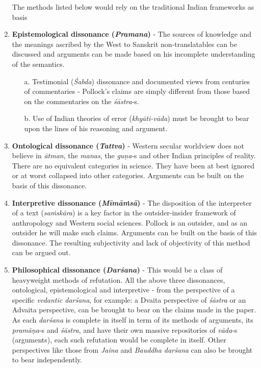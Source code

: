 \begin{enumerate}
The methods listed below would rely on the traditional Indian frameworks as basis

\item {\bf Epistemological dissonance ({{\sl\bfseries Pramana}\relax})} - The sources of knowledge and the meanings ascribed by the West to Sanskrit non-translatables can be discussed and arguments can be made based on his incomplete understanding of the semantics.
\begin{itemize}
\item[a.]  Testimonial ({\sl Śabda}) dissonance and documented views from centuries of commentaries - Pollock's claims are simply different from those based on the commentaries on the {\sl śāstra}-s.

\item[b.] Use of Indian theories of error ({\sl khyāti-vāda}) must be brought to bear upon the lines of his reasoning and argument.
\end{itemize}

\item {\bf Ontological dissonance ({{\sl\bfseries Tattva}\relax})} -  Western secular worldview does not believe in {\sl ātman}, the {\sl manas}, the {\sl guṇa}-s and other Indian principles of reality. There are no equivalent categories in science. They have been at best ignored or at worst collapsed into other categories. Arguments can be built on the basis of this dissonance.

\item {\bf Interpretive dissonance ({{\sl\bfseries Mīmāṁsā}\relax})} - The disposition of the interpreter of a text ({\sl saṁskāra}) is a key factor in the outsider-insider framework of anthropology and Western social sciences. Pollock is an outsider, and as an outsider he will make such claims. Arguments can be built on the basis of this dissonance. The resulting subjectivity and lack of objectivity of this method can be argued out.

\item {\bf Philosophical dissonance ({{\sl\bfseries Darśana}\relax})} - This would be a class of heavyweight methods of refutation. All the above three dissonances, ontological, epistemological and interpretive - from the perspective of a specific {\sl vedantic darśana}, for example: a Dvaita perspective of {\sl śāstra} or an Advaita perspective, can be brought to bear on the claims made in the paper. As each {\sl darśana} is complete in itself in term of its methods of arguments, its {\sl pramāṇa}-s and {\sl śāstra}, and have their own massive repositories of {\sl vāda}-s (arguments), each such refutation would be complete in itself. Other perspectives like those from {\sl Jaina} and {\sl Bauddha darśana} can also be brought to bear independently.


\end{enumerate}
